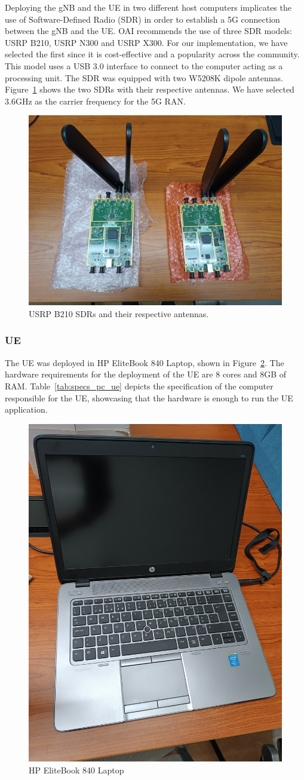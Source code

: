 Deploying the gNB and the UE in two different host computers implicates the use of Software-Defined Radio (SDR) in order to establish a 5G connection between the gNB and the UE\@.
OAI recommends the use of three SDR models: USRP B210, USRP N300 and USRP X300\@ \cite{openairinterface_tutorial}.
For our implementation, we have selected the first since it is cost-effective and a popularity across the community.
This model uses a USB 3.0 interface to connect to the computer acting as a processing unit.
The SDR was equipped with two W5208K dipole antennas.
Figure~\ref{fig:SDRs} shows the two SDRs with their respective antennas.
We have selected 3.6GHz as the carrier frequency for the 5G RAN\@.

\begin{figure}[H]
    \centering
    \includegraphics[width=0.5\linewidth]{figures/SDRs}
    \caption{USRP B210 SDRs and their respective antennas.}
    \label{fig:SDRs}
\end{figure}



\subsubsection{UE}
The UE was deployed in HP EliteBook 840 Laptop, shown in Figure~\ref{fig:computer_hp}.
The hardware requirements for the deployment of the UE are 8 cores and 8GB of RAM\@.
Table~\ref{tab:specs_pc_ue} depicts the specification of the computer responsible for the UE\@, showcasing that the hardware is enough to run the UE application.

\begin{figure}[H]
    \centering
    \includegraphics[width=0.3\linewidth]{figures/hp}
    \caption{HP EliteBook 840 Laptop}
    \label{fig:computer_hp}
\end{figure}

